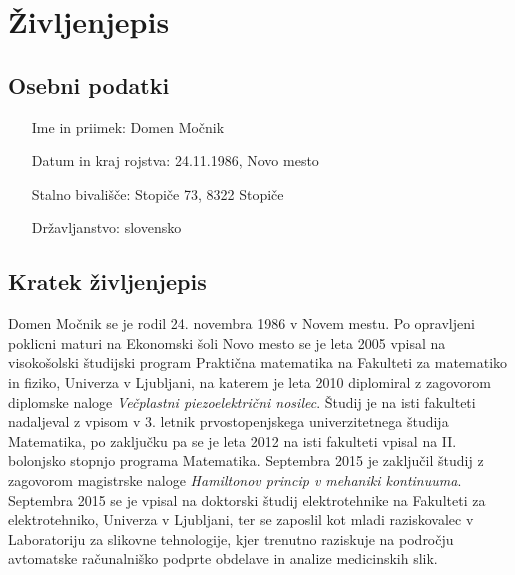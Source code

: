 \documentclass[a4paper,twoside,11pt]{article}
\begin{document}
	\section{Življenjepis}
	
	\subsection*{Osebni podatki}
	\begin{itemize}[align=left, itemsep=-0.1cm, leftmargin=4.25cm, labelwidth=*]
		\item[Ime in priimek:] Domen Močnik
		\item[Datum in kraj rojstva:] 24.11.1986, Novo mesto
		\item[Stalno bivališče:] Stopiče 73, 8322 Stopiče
		\item[Državljanstvo:] slovensko
	\end{itemize}
	
	\subsection*{Kratek življenjepis}
	\par{
		Domen Močnik se je rodil 24. novembra 1986 v Novem mestu. Po opravljeni poklicni maturi na Ekonomski šoli Novo mesto se je leta 2005 vpisal na visokošolski študijski program Praktična matematika na Fakulteti za matematiko in fiziko, Univerza v Ljubljani, na katerem je leta 2010 diplomiral z zagovorom diplomske naloge \textit{Večplastni piezoelektrični nosilec}. Študij je na isti fakulteti nadaljeval z vpisom v 3. letnik prvostopenjskega univerzitetnega študija Matematika, po zaključku pa se je leta 2012 na isti fakulteti vpisal na II. bolonjsko stopnjo programa Matematika. Septembra 2015 je zaključil študij z zagovorom magistrske naloge \textit{Hamiltonov princip v mehaniki kontinuuma}. Septembra 2015 se je vpisal na doktorski študij elektrotehnike na Fakulteti za elektrotehniko, Univerza v Ljubljani, ter se zaposlil kot mladi raziskovalec v Laboratoriju za slikovne tehnologije, kjer trenutno raziskuje na področju avtomatske računalniško podprte obdelave in analize medicinskih slik.
	}
	
\end{document}
